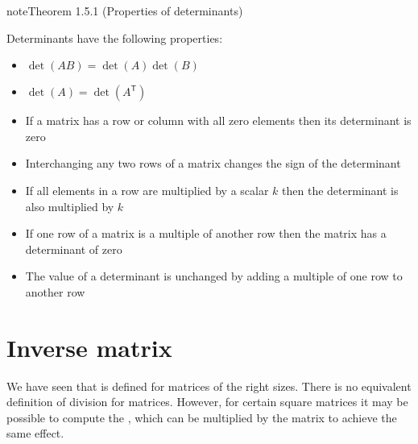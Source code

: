 \documentclass[letterpaper,10pt,english]{jupyterBook}
\begin{document}
\ignorespaces \label{_pages/1.4_Determinants:properties-of-determinants-theorem}
\begin{sphinxadmonition}{note}{Theorem 1.5.1 (Properties of determinants)}



\sphinxAtStartPar
Determinants have the following properties:
\begin{itemize}
\item {} 
\sphinxAtStartPar
\(\det(AB) = \det(A)\det(B)\)

\item {} 
\sphinxAtStartPar
\(\det(A) = \det(A^\mathsf{T})\)

\item {} 
\sphinxAtStartPar
If a matrix has a row or column with all zero elements then its determinant is zero

\item {} 
\sphinxAtStartPar
Interchanging any two rows of a matrix changes the sign of the determinant

\item {} 
\sphinxAtStartPar
If all elements in a row are multiplied by a scalar \(k\) then the determinant is also multiplied by \(k\)

\item {} 
\sphinxAtStartPar
If one row of a matrix is a multiple of another row then the matrix has a determinant of zero

\item {} 
\sphinxAtStartPar
The value of a determinant is unchanged by adding a multiple of one row to another row

\end{itemize}
\end{sphinxadmonition}

\sphinxstepscope

\ignorespaces 

\section{Inverse matrix}
\label{\detokenize{_pages/1.5_Inverse_matrix:inverse-matrix}}\label{\detokenize{_pages/1.5_Inverse_matrix:index-0}}\label{\detokenize{_pages/1.5_Inverse_matrix:inverse-matrix-section}}\label{\detokenize{_pages/1.5_Inverse_matrix::doc}}
\sphinxAtStartPar
We have seen that {\hyperref[\detokenize{_pages/1.2_Matrix_multiplication:matrix-multiplication-definition}]{}} is defined for matrices of the right sizes. There is no equivalent definition of division for matrices. However, for certain square matrices it may be possible to compute the , which can be multiplied by the matrix to achieve the same effect.
\end{document}
